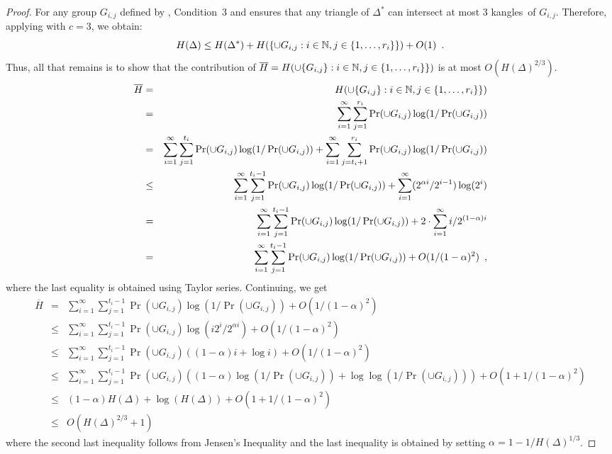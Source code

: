 \documentclass[charterfonts,lotsofwhite]{patmorin}
\newcommand{\kangles}{kangles}
\begin{document}
\begin{proof}
For any group $G_{i,j}$ defined by , Condition~3 and
 ensures that any triangle of $\Delta^*$ can
intersect at most 3 \kangles\ of $G_{i,j}$.  Therefore, applying
 with $c=3$, we obtain:
\[ 
 H(\Delta) \le 
   H(\Delta^*) + H(\{{\cup G_{i,j}} : i\in\mathbb{N} , j\in\{1,\ldots,r_i\}\}) 
   + O(1)  \enspace .
\]
Thus, all that remains is to show that the contribution of $\overline
H=H(\cup\{G_{i,j}\} : i\in\mathbb{N} , j\in\{1,\ldots,r_i\}\})$ is at most
$O(H(\Delta)^{2/3})$.
\begin{eqnarray*}
\overline H 
 & = & H(\cup\{G_{i,j}\} : i\in\mathbb{N} , j\in\{1,\ldots,r_i\}\}) \\
 & = & \sum_{i=1}^\infty
         \sum_{j=1}^{r_i}\Pr(\cup G_{i,j})\log(1/\Pr(\cup G_{i,j})) \\
 & = & \sum_{i=1}^\infty
         \sum_{j=1}^{t_i}\Pr(\cup G_{i,j})\log(1/\Pr(\cup G_{i,j})) 
         + \sum_{i=1}^\infty
         \sum_{j=t_i+1}^{r_i}\Pr(\cup G_{i,j})\log(1/\Pr(\cup G_{i,j})) \\
 & \le & \sum_{i=1}^\infty
         \sum_{j=1}^{t_i-1}\Pr(\cup G_{i,j})\log(1/\Pr(\cup G_{i,j})) 
         + \sum_{i=1}^{\infty} (2^{\alpha i}/ 2^{i-1})\log(2^i) \\
 &  =  & \sum_{i=1}^\infty
         \sum_{j=1}^{t_i-1}\Pr(\cup G_{i,j})\log(1/\Pr(\cup G_{i,j})) 
         + 2\cdot\sum_{i=1}^{\infty} i/2^{(1-\alpha)i} \\
 &  =  & \sum_{i=1}^\infty
         \sum_{j=1}^{t_i-1}\Pr(\cup G_{i,j})\log(1/\Pr(\cup G_{i,j}))
         + O(1/(1-\alpha)^2) \enspace ,
\end{eqnarray*}
where the last equality is obtained using Taylor series.
Continuing, we get 
\begin{eqnarray*}
\overline H
 &  =  & \sum_{i=1}^\infty
         \sum_{j=1}^{t_i-1}\Pr(\cup G_{i,j})\log(1/\Pr(\cup G_{i,j}))
         + O(1/(1-\alpha)^2) \\
 & \le  & \sum_{i=1}^\infty
         \sum_{j=1}^{t_i-1} \Pr(\cup G_{i,j})
              \log(i2^{i}/2^{\alpha i})
         + O(1/(1-\alpha)^2) \\
 & \le  & \sum_{i=1}^\infty
         \sum_{j=1}^{t_i-1} \Pr(\cup G_{i,j})((1-\alpha)i+\log i)
         + O(1/(1-\alpha)^2) \\
 & \le  & \sum_{i=1}^\infty
         \sum_{j=1}^{t_i-1} \Pr(\cup G_{i,j})((1-\alpha)\log(1/\Pr(\cup G_{i,j})) + \log\log(1/\Pr(\cup G_{i,j})))
         + O(1 + 1/(1-\alpha)^2) \\
 & \le &  (1-\alpha)H(\Delta) + \log(H(\Delta)) + O(1 + 1/(1-\alpha)^2) \\
 & \le &  O(H(\Delta)^{2/3}+ 1)
\end{eqnarray*} 
where the second last inequality follows from Jensen's Inequality and the
last inequality is obtained by setting $\alpha=1-1/H(\Delta)^{1/3}$.
\end{proof}
\end{document}
